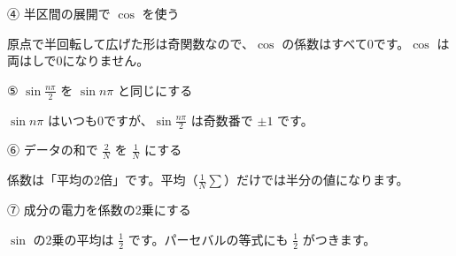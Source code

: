 \begingroup{}%
\noindent\begin{minipage}[t]{0.485\linewidth}\vspace{0pt}
\begin{tsumazuki}{④ 半区間の展開で $\cos$ を使う}
\raggedright{}
原点で半回転して広げた形は奇関数なので、$\cos$ の係数はすべて0です。$\cos$ は両はしで0になりません。
\end{tsumazuki}
\end{minipage}\hfill
\begin{minipage}[t]{0.485\linewidth}\vspace{0pt}
\begin{tsumazuki}{⑤ $\sin\frac{n\pi}{2}$ を $\sin n\pi$ と同じにする}
\raggedright{}
$\sin n\pi$ はいつも0ですが、$\sin\frac{n\pi}{2}$ は奇数番で $\pm1$ です。
\end{tsumazuki}
\end{minipage}\par
\endgroup

\begingroup{}%
\noindent\begin{minipage}[t]{0.485\linewidth}\vspace{0pt}
\begin{tsumazuki}{⑥ データの和で $\frac{2}{N}$ を $\frac{1}{N}$ にする}
\raggedright{}
係数は「平均の2倍」です。平均（$\frac{1}{N}\sum$）だけでは半分の値になります。
\end{tsumazuki}
\end{minipage}\hfill
\begin{minipage}[t]{0.485\linewidth}\vspace{0pt}
\begin{tsumazuki}{⑦ 成分の電力を係数の2乗にする}
\raggedright{}
$\sin$ の2乗の平均は $\frac12$ です。パーセバルの等式にも $\frac12$ がつきます。
\end{tsumazuki}
\end{minipage}\par
\endgroup

